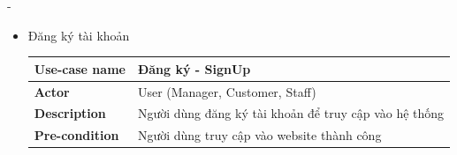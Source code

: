 \begin {list} {-}{}
\begin{itemize}
    \item Đăng ký tài khoản
    \begin{table}[h]
        \begin{tabular}{|l|l|}
        \hline
        \textbf{Use-case name}    & \textbf{Đăng ký - SignUp}                                                                                                                                                                                                                                                                                                                                                                                                                                                                                                                              \\ \hline
        \textbf{Actor}            & User (Manager, Customer, Staff)                                                                                                                                                                                                                                                                                                                                                                                                                                                                                                                        \\ \hline
        \textbf{Description}      & Người dùng đăng ký tài khoản để truy cập vào hệ thống                                                                                                                                                                                                                                                                                                                                                                                                                                                                                                  \\ \hline
        \textbf{Pre-condition}    & Người dùng truy cập vào website thành công                                                                                                                                                                                                                                                                                                                                                                                                                                                                                                             \\ \hline

\end{tabular}
\end{table}
\end{itemize}
\end{list}
